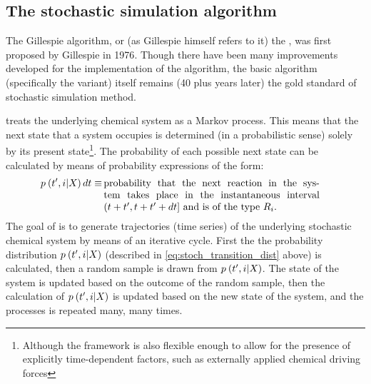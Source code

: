 \subsection{The stochastic simulation algorithm}

The Gillespie algorithm, or (as Gillespie himself refers to it\supercite{Gillespie:2013kk}) the , was first proposed by Gillespie in 1976\supercite{Gillespie:1976bj}. Though there have been many improvements developed for the implementation\supercite{Gibson:2000jqa,Cao:2004cua,Lok:2005ii,McCollum:2006hj} of the algorithm, the basic algorithm (specifically the  variant) itself remains (40 plus years later) the gold standard of stochastic simulation method.

 treats the underlying chemical system as a Markov process. This means that the next state that a system occupies is determined (in a probabilistic sense) solely by its present state\footnote{Although the framework is also flexible enough to allow for the presence of explicitly time-dependent factors, such as externally applied chemical driving forces}. The probability of each possible next state can be calculated by means of probability expressions of the form:
\begin{align}\label{eq:stoch_transition_dist}
    \transp \dt \equiv&\, \parbox[t]{0.63\linewidth}{probability that the next reaction in the system takes place in the instantaneous interval $\timeintp$ and is of the type $\rxn$.}
\end{align}
The goal of  is to generate trajectories (\ie time series) of the underlying stochastic chemical system by means of an iterative cycle. First the the probability distribution $p_{} \left( t', i | X_{} \right)$ (described in \eqref{eq:stoch_transition_dist} above) is calculated, then a random sample is drawn from $p_{} \left( t', i | X_{} \right)$. The state of the system is updated based on the outcome of the random sample, then the calculation of $p_{} \left( t', i | X_{} \right)$ is updated based on the new state of the system, and the processes is repeated many, many times.
 
